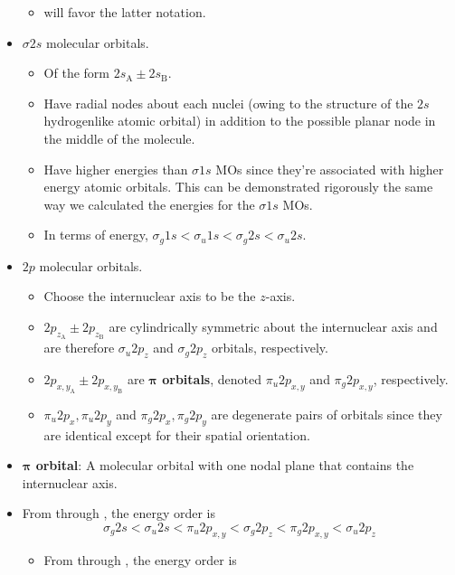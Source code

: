 \documentclass[../notes.tex]{subfiles}
\begin{document}
\begin{itemize}
\begin{itemize}
        \item \textcite{bib:McQuarrieSimon} will favor the latter notation.
    \end{itemize}
    \item $\sigma 2s$ molecular orbitals.
    \begin{itemize}
        \item Of the form $2s_\text{A}\pm 2s_\text{B}$.
        \item Have radial nodes about each nuclei (owing to the structure of the $2s$ hydrogenlike atomic orbital) in addition to the possible planar node in the middle of the molecule.
        \item Have higher energies than $\sigma 1s$ MOs since they're associated with higher energy atomic orbitals. This can be demonstrated rigorously the same way we calculated the energies for the $\sigma 1s$ MOs.
        \item In terms of energy, $\sigma_g1s<\sigma_u1s<\sigma_g2s<\sigma_u2s$.
    \end{itemize}
    \item $2p$ molecular orbitals.
    \begin{itemize}
        \item Choose the internuclear axis to be the $z$-axis.
        \item $2p_{z_\text{A}}\pm 2p_{z_\text{B}}$ are cylindrically symmetric about the internuclear axis and are therefore $\sigma_u2p_z$ and $\sigma_g2p_z$ orbitals, respectively.
        \item $2p_{x,y_\text{A}}\pm 2p_{x,y_\text{B}}$ are \textbf{$\bm{\pi}$ orbitals}, denoted $\pi_u2p_{x,y}$ and $\pi_g2p_{x,y}$, respectively.
        \item $\pi_u2p_x,\pi_u2p_y$ and $\pi_g2p_x,\pi_g2p_y$ are degenerate pairs of orbitals since they are identical except for their spatial orientation.
    \end{itemize}
    \item \textbf{$\bm{\pi}$ orbital}: A molecular orbital with one nodal plane that contains the internuclear axis.
    \item From  through , the energy order is
    \begin{equation*}
        \sigma_g2s < \sigma_u2s
        < \pi_u2p_{x,y}
        < \sigma_g2p_z
        < \pi_g2p_{x,y}
        < \sigma_u2p_z
    \end{equation*}
    \begin{itemize}
        \item From  through , the energy order is

\end{itemize}
\end{itemize}
\end{document}
